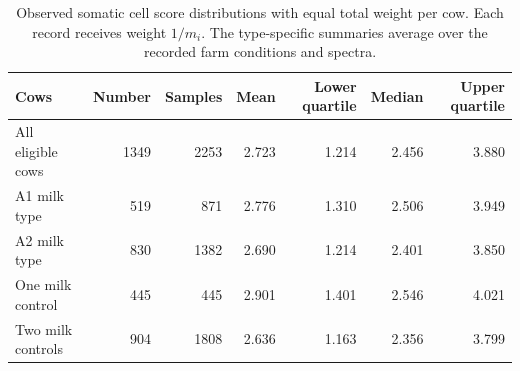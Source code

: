 \begin{table}[t]
\centering
\small
\caption{Observed somatic cell score distributions with equal total weight per cow. Each record receives weight $1/m_i$. The type-specific summaries average over the recorded farm conditions and spectra.}
\label{tab:milk-descriptive}
\begin{tabular}{lrrrrrr}
\toprule
Cows & Number & Samples & Mean & Lower quartile & Median & Upper quartile \\
\midrule
All eligible cows & 1349 & 2253 & 2.723 & 1.214 & 2.456 & 3.880 \\
A1 milk type & 519 & 871 & 2.776 & 1.310 & 2.506 & 3.949 \\
A2 milk type & 830 & 1382 & 2.690 & 1.214 & 2.401 & 3.850 \\
One milk control & 445 & 445 & 2.901 & 1.401 & 2.546 & 4.021 \\
Two milk controls & 904 & 1808 & 2.636 & 1.163 & 2.356 & 3.799 \\
\bottomrule
\end{tabular}
\end{table}
